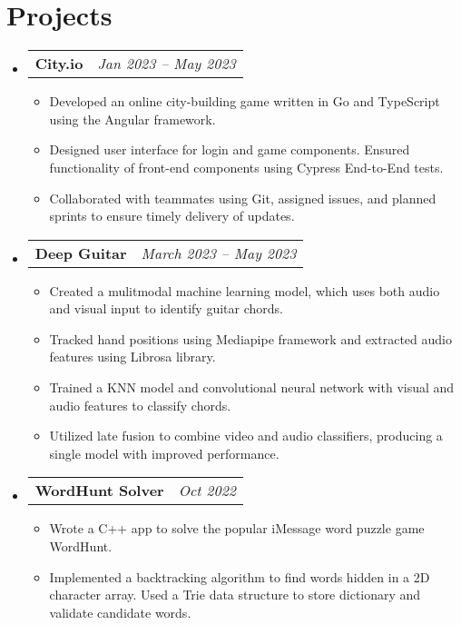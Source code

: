 \documentclass[letterpaper,11pt]{article}
\makeatletter
\newcommand{\resumeItemExperience}[1]{
  \item\small{
    {#1 \vspace{-2pt}}
  }
}
\newcommand{\resumeSubheadingProject}[2]{
  \vspace{-1pt}\item
    \begin{tabular*}{0.97\textwidth}{l@{\extracolsep{\fill}}r}
      \textbf{#1} & \textit{\small #2} \\
    \end{tabular*}\vspace{-5pt}
}
\newcommand{\resumeSubHeadingListStart}{\begin{itemize}[leftmargin=*, label={}]}
\newcommand{\resumeSubHeadingListEnd}{\end{itemize}}
\newcommand{\resumeItemListStart}{\begin{itemize}}
\newcommand{\resumeItemListEnd}{\end{itemize}\vspace{-5pt}}
\makeatother
\begin{document}
\section{Projects}
  \resumeSubHeadingListStart
        \resumeSubheadingProject
          {City.io}{Jan 2023 -- May 2023}
          \resumeItemListStart
            \resumeItemExperience
              {Developed an online city-building game written in Go and TypeScript using the Angular framework.}
            \resumeItemExperience
              {Designed user interface for login and game components. Ensured functionality of front-end components using Cypress End-to-End tests.}
            \resumeItemExperience
              {Collaborated with teammates using Git, assigned issues, and planned sprints to ensure timely delivery of updates.}
          \resumeItemListEnd
        \resumeSubheadingProject
          {Deep Guitar}{March 2023 -- May 2023}
          \resumeItemListStart
            \resumeItemExperience
              {Created a mulitmodal machine learning model, which uses both audio and visual input to identify guitar chords.}
            \resumeItemExperience
              {Tracked hand positions using Mediapipe framework and extracted audio features using Librosa library.}
            \resumeItemExperience
              {Trained a KNN model and convolutional neural network with visual and audio features to classify chords.}
            \resumeItemExperience
              {Utilized late fusion to combine video and audio classifiers, producing a single model with improved performance.}
          \resumeItemListEnd
        \resumeSubheadingProject
          {WordHunt Solver}{Oct 2022}
          \resumeItemListStart
            \resumeItemExperience
              {Wrote a C++ app to solve the popular iMessage word puzzle game WordHunt.}
            \resumeItemExperience
              {Implemented a backtracking algorithm to find words hidden in a 2D character array. Used a Trie data structure to store dictionary and validate candidate words.}
          \resumeItemListEnd
    \resumeSubHeadingListEnd
    
\end{document}
